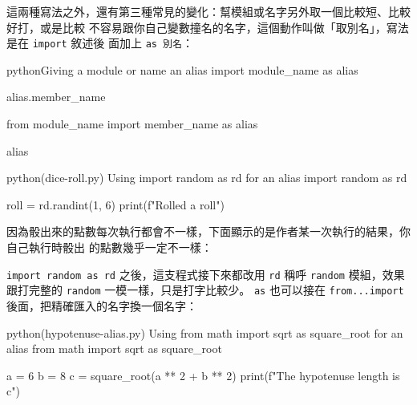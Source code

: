 這兩種寫法之外，還有第三種常見的變化：幫模組或名字另外取一個比較短、比較好打，或是比較
不容易跟你自己變數撞名的名字，這個動作叫做「取別名」，寫法是在 \texttt{import} 敘述後
面加上 \texttt{as 別名}：

\begin{code}{python}{Giving a module or name an alias}
import module_name as alias

alias.member_name

from module_name import member_name as alias

alias
\end{code}

\begin{example}{python}{(dice-roll.py) Using import random as rd for an alias}
import random as rd

roll = rd.randint(1, 6)
print(f"Rolled a {roll}")
\end{example}

因為骰出來的點數每次執行都會不一樣，下面顯示的是作者某一次執行的結果，你自己執行時骰出
的點數幾乎一定不一樣：


\texttt{import random as rd} 之後，這支程式接下來都改用 \texttt{rd} 稱呼
\texttt{random} 模組，效果跟打完整的 \texttt{random} 一模一樣，只是打字比較少。
\texttt{as} 也可以接在 \texttt{from...import} 後面，把精確匯入的名字換一個名字：

\begin{example}{python}{(hypotenuse-alias.py) Using from math import sqrt as square\_root for an alias}
from math import sqrt as square_root

a = 6
b = 8
c = square_root(a ** 2 + b ** 2)
print(f"The hypotenuse length is {c}")
\end{example}



